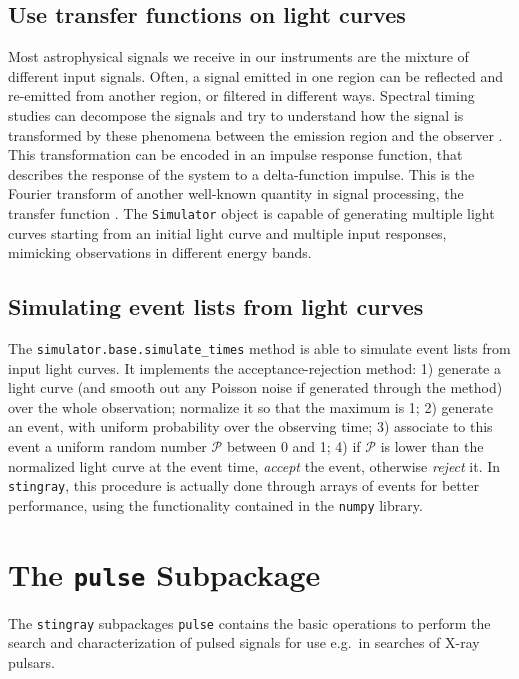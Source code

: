 \documentclass[twocolumn]{aastex62}
\newcommand{\stingray}{\texttt{stingray}\xspace}
\begin{document}
\subsection{Use transfer functions on light curves}
Most astrophysical signals we receive in our instruments are the mixture of different input signals. 
Often, a signal emitted in one region can be reflected and re-emitted from another region, or filtered in different ways. 
Spectral timing studies can decompose the signals and try to understand how the signal is transformed by these phenomena between the emission region and the observer \citep[See][for a review]{uttley2014}.
This transformation can be encoded in an impulse response function, that describes the response of the system to a delta-function impulse. This is the Fourier transform of another well-known quantity in signal processing, the transfer function \citep[See the textbook by][]{girod2001signals}.
The \texttt{Simulator} object is capable of generating multiple light curves starting from an initial light curve and multiple input responses, mimicking observations in different energy bands. 

\subsection{Simulating event lists from light curves}
The \texttt{simulator.base.simulate\_times} method is able to simulate event lists from input light curves.
It implements the acceptance-rejection method: 
1) generate a light curve (and smooth out any Poisson noise if generated through the \citealt{timmer1995} method) over the whole observation; normalize it so that the maximum is 1; 
2) generate an event, with uniform probability over the observing time; 
3) associate to this event a uniform random number $\mathcal{P}$ between 0 and 1; 
4) if $\mathcal{P}$ is lower than the normalized light curve at the event time, \textit{accept} the event, otherwise \textit{reject} it.
In \stingray, this procedure is actually done through arrays of events for better performance, using the functionality contained in the \texttt{numpy} library. 





\section{The \texttt{pulse} Subpackage}
\label{sec:pulsar}
The \stingray subpackages \texttt{pulse} contains the basic operations to perform the search and characterization of pulsed signals for use e.g.\ in searches of X-ray pulsars.
\end{document}
